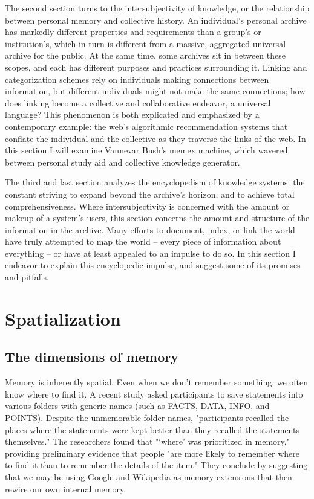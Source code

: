 The second section turns to the intersubjectivity of knowledge, or the relationship between personal memory and collective history. An individual's personal archive has markedly different properties and requirements than a group's or institution's, which in turn is different from a massive, aggregated universal archive for the public. At the same time, some archives sit in between these scopes, and each has different purposes and practices surrounding it. Linking and categorization schemes rely on individuals making connections between information, but different individuals might not make the same connections; how does linking become a collective and collaborative endeavor, a universal language? This phenomenon is both explicated and emphasized by a contemporary example: the web's algorithmic recommendation systems that conflate the individual and the collective as they traverse the links of the web. In this section I will examine Vannevar Bush's memex machine, which wavered between personal study aid and collective knowledge generator.

The third and last section analyzes the encyclopedism of knowledge systems: the constant striving to expand beyond the archive's horizon, and to achieve total comprehensiveness. Where intersubjectivity is concerned with the amount or makeup of a system's users, this section concerns the amount and structure of the information in the archive. Many efforts to document, index, or link the world have truly attempted to map the world – every piece of information about everything – or have at least appealed to an impulse to do so. In this section I endeavor to explain this encyclopedic impulse, and suggest some of its promises and pitfalls.

\section{Spatialization}

\subsection{The dimensions of memory}

Memory is inherently spatial. Even when we don't remember something, we often know where to find it. A recent study asked participants to save statements into various folders with generic names (such as FACTS, DATA, INFO, and POINTS).  Despite the unmemorable folder names, "participants recalled the places where the statements were kept better than they recalled the statements themselves." The researchers found that "‘where' was prioritized in memory," providing preliminary evidence that people "are more likely to remember where to find it than to remember the details of the item." They conclude by suggesting that we may be using Google and Wikipedia as memory extensions that then rewire our own internal memory.


